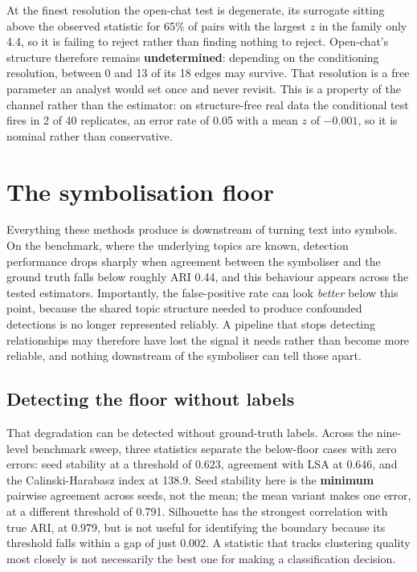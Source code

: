 \documentclass[10pt]{article}
\begin{document}
At the finest resolution the open-chat test is degenerate, its surrogate sitting above the observed
statistic for 65\% of pairs with the largest $z$ in the family only 4.4, so it is failing to reject
rather than finding nothing to reject. Open-chat's structure therefore remains
\textbf{undetermined}: depending on the conditioning resolution, between 0 and 13 of its 18 edges may
survive. That resolution is a free parameter an analyst would set once and never revisit. This is a
property of the channel rather than the estimator: on structure-free real data the conditional test
fires in 2 of 40 replicates, an error rate of 0.05 with a mean $z$ of $-0.001$, so it is nominal
rather than conservative.

\section{The symbolisation floor}
\label{sec:floor}

Everything these methods produce is downstream of turning text into symbols. On the benchmark, where
the underlying topics are known, detection performance drops sharply when agreement between the
symboliser and the ground truth falls below roughly ARI 0.44, and this behaviour appears across the
tested estimators. Importantly, the false-positive rate can look \emph{better} below this point,
because the shared topic structure needed to produce confounded detections is no longer represented
reliably. A pipeline that stops detecting relationships may therefore have lost the signal it needs
rather than become more reliable, and nothing downstream of the symboliser can tell those apart.

\subsection{Detecting the floor without labels}

That degradation can be detected without ground-truth labels. Across the nine-level benchmark sweep,
three statistics separate the below-floor cases with zero errors: seed stability at a threshold of
0.623, agreement with LSA at 0.646, and the Calinski-Harabasz index at 138.9. Seed stability here is
the \textbf{minimum} pairwise agreement across seeds, not the mean; the mean variant makes one error,
at a different threshold of 0.791. Silhouette has the strongest correlation with true ARI, at 0.979,
but is not useful for identifying the boundary because its threshold falls within a gap of just
0.002. A statistic that tracks clustering quality most closely is not necessarily the best one for
making a classification decision.
\end{document}
